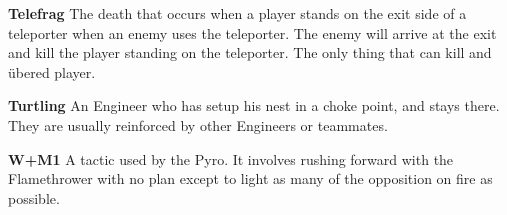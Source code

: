 {\bf Telefrag} The death that occurs when a player stands on the exit side of a teleporter when an enemy uses the teleporter. The enemy will arrive at the exit and kill the player standing on the teleporter. The only thing that can kill and übered player.

{\bf Turtling} An Engineer who has setup his nest in a choke point, and stays there. They are usually reinforced by other Engineers or teammates.

{\bf W+M1} A tactic used by the Pyro. It involves rushing forward with the Flamethrower with no plan except to light as many of the opposition on fire as possible.